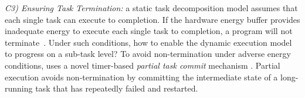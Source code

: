 \noindent\emph{C3) Ensuring Task Termination:} a static task decomposition model assumes that each
single task can execute to completion. If the hardware energy buffer provides
inadequate energy to execute each single task to completion, a program will not
terminate~\cite{cleancut_2018}. Under such conditions, how to enable the dynamic execution model to progress on a sub-task level? To avoid non-termination under adverse
energy conditions, \sys uses a novel timer-based {\em partial task commit} mechanism .
Partial execution avoids non-termination by committing the intermediate state of a long-running
task that has repeatedly failed and restarted.

%

